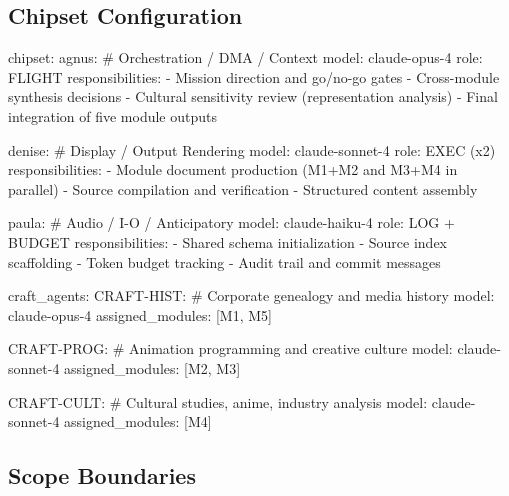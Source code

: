 \documentclass[11pt,letterpaper]{article}
\begin{document}
\subsection{Chipset Configuration}

\begin{asciibox}
chipset:
  agnus:  # Orchestration / DMA / Context
    model: claude-opus-4
    role: FLIGHT
    responsibilities:
      - Mission direction and go/no-go gates
      - Cross-module synthesis decisions
      - Cultural sensitivity review (representation analysis)
      - Final integration of five module outputs

  denise:  # Display / Output Rendering
    model: claude-sonnet-4
    role: EXEC (x2)
    responsibilities:
      - Module document production (M1+M2 and M3+M4 in parallel)
      - Source compilation and verification
      - Structured content assembly

  paula:   # Audio / I-O / Anticipatory
    model: claude-haiku-4
    role: LOG + BUDGET
    responsibilities:
      - Shared schema initialization
      - Source index scaffolding
      - Token budget tracking
      - Audit trail and commit messages

craft_agents:
  CRAFT-HIST:  # Corporate genealogy and media history
    model: claude-opus-4
    assigned_modules: [M1, M5]

  CRAFT-PROG:  # Animation programming and creative culture
    model: claude-sonnet-4
    assigned_modules: [M2, M3]

  CRAFT-CULT:  # Cultural studies, anime, industry analysis
    model: claude-sonnet-4
    assigned_modules: [M4]
\end{asciibox}

\subsection{Scope Boundaries}
\end{document}
